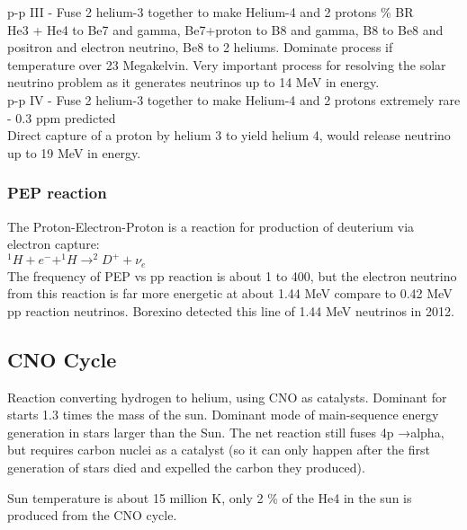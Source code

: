                     \newline
                    \indent p-p III \indent - \indent Fuse 2 helium-3 together to make Helium-4 and 2 protons \% BR\\ He3 + He4 to Be7 and gamma, Be7+proton to B8 and gamma, B8 to Be8 and positron and electron neutrino, Be8 to 2 heliums. Dominate process if temperature over 23 Megakelvin. Very important process for resolving the solar neutrino problem as it generates neutrinos up to 14 MeV in energy. \\
                    \newline
                    \indent p-p IV \indent - \indent Fuse 2 helium-3 together to make Helium-4 and 2 protons \indent extremely rare - 0.3 ppm predicted\\ Direct capture of a proton by helium 3 to yield helium 4, would release neutrino up to 19 MeV in energy.
                
                \subsubsection{PEP reaction}
                    \indent The Proton-Electron-Proton is a reaction for production of deuterium via electron capture:\\
                    \newline
                    $^1H + e^- + ^1H \longrightarrow ^2D^+ + \nu_e$\\
                    \newline
                    \indent The frequency of PEP vs pp reaction is about 1 to 400, but the electron neutrino from this reaction is far more energetic at about 1.44 MeV compare to 0.42 MeV pp reaction neutrinos. Borexino detected this line of 1.44 MeV neutrinos in 2012. 
                    
        \subsection{CNO Cycle}
            \indent Reaction converting hydrogen to helium, using CNO as catalysts. Dominant for starts 1.3 times the mass of the sun. Dominant mode of main-sequence energy generation in stars larger than the Sun. The net reaction still fuses 4p →alpha, but requires carbon nuclei as a catalyst (so it can only happen after the first generation of stars died and expelled the carbon they produced). 
            
            Sun temperature is about 15 million K, only 2 \% of the He4 in the sun is produced from the CNO cycle. 
            
